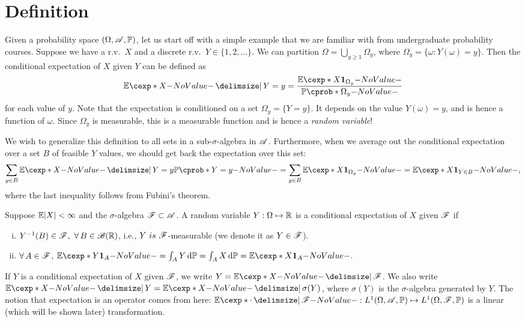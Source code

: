 \documentclass[12pt]{article}
\begin{document}

\section{Definition}
Given a probability space $(\Omega,\scA,\P)$, let us start off with a simple example that we are familiar with from undergraduate probability courses. Suppose we have a r.v.\ $X$ and a discrete r.v.\ $Y \in \{1,2,\ldots\}$. We can partition $\Omega = \bigcup_{y \geq 1 } \Omega_y$, where $\Omega_y = \{ \omega: Y(\omega)=y\}$.  Then the conditional expectation of $X$ given $Y$ can be defined as
\begin{align*}
\E[X]{Y=y} = \frac{\E[X\indicatore{\Omega_y}]}{\P (\Omega_y)}
\end{align*}
for each value of $y$. Note that the expectation is conditioned on a set $\Omega_y=\{Y=y\}$. It depends on the value $Y(\omega)=y$, and is hence a function of $\omega$. Since $\Omega_y$ is measurable, this is a measurable function and is hence a \emph{random variable}! 

We wish to generalize this definition to all sets in a sub-$\sigma$-algebra in $\mathscr{A}$. Furthermore, when we average out the conditional expectation over a set $B$ of feasible $Y$ values, we should get back the expectation over this set:
\begin{align*}
\sum_{y\in B} \E[X]{Y=y} \P(Y=y) = \sum_{y\in B} \E[X\indicatore{\Omega_y}] = \E[X\indicatore{Y\in B}],
\end{align*}
where the last inequality follows from Fubini's theorem.
	
\begin{Definition}\label{wk12:expectation}
Suppose $\E |X|<\infty$ and the $\sigma$-algebra $\mathscr{F} \subset \mathscr{A}$. A random variable $Y:\Omega \mapsto \mathbb{R}$ is a conditional expectation of $X$ given $\mathscr{F}$ if
\begin{enumerate}[(i)]
\item $Y^{-1}(B)\in \scF, \ \forall B \in \scB(\Real)$, i.e., $Y\ is\ \scF$-measurable (we denote it as $Y\in\mathscr{F}$).
\item $\forall A \in \scF$, $\E[Y\indicatore{A}] = \int_{A} Y \ud \P=\int _A X \ud \P = \E[X\indicatore{A}]$.
\end{enumerate}
\end{Definition}
If $Y$ is a conditional expectation of $X$ given $\mathscr{F}$, we write $Y = \E[X]{\scF}$. We also write $\E[X]{Y}=\E[X]{\sigma(Y)}$, where $\sigma(Y)$ is the $\sigma$-algebra generated by $Y$. The notion that expectation is an operator comes from here: $\E[{\cdot} \given \scF] : L^1(\Omega,\scA,\P) \mapsto L^1(\Omega,\scF,\P)$ is a linear (which will be shown later) transformation.
\end{document}
